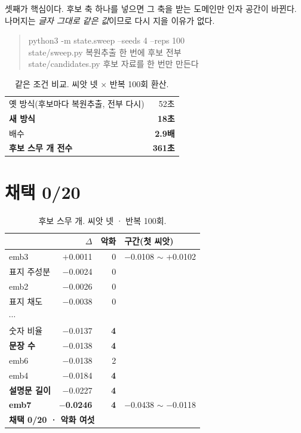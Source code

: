 \documentclass[10pt]{article}
\begin{document}
셋째가 핵심이다. 후보 축 하나를 넣으면 그 축을 받는 도메인만 인자 공간이
바뀐다. 나머지는 \emph{글자 그대로 같은 값}이므로 다시 지을 이유가 없다.

\begin{quote}\fontsize{9.0}{11}\selectfont\ttfamily
python3 -m state.sweep --seeds 4 --reps 100\\[.3em]
\rm state/sweep.py \quad 복원추출 한 번에 후보 전부\\
\rm state/candidates.py \quad 후보 자료를 한 번만 만든다
\end{quote}

\begin{table}[t]
\centering\tsize
\caption{같은 조건 비교. 씨앗 넷 $\times$ 반복 100회 환산.}
\begin{tabular}{lr}
\toprule
옛 방식(후보마다 복원추출, 전부 다시) & 52초 \\
\textbf{새 방식} & \textbf{18초} \\
\midrule
배수 & \textbf{2.9배} \\
\midrule
\textbf{후보 스무 개 전수} & \textbf{361초} \\
\bottomrule
\end{tabular}
\end{table}


\section{채택 0/20}

\begin{table}[t]
\centering\tsize
\caption{후보 스무 개. 씨앗 넷 · 반복 100회.}
\begin{tabular}{lrrl}
\toprule
& $\Delta$ & 악화 & 구간(첫 씨앗) \\
\midrule
emb3 & $+$0.0011 & 0 & $-$0.0108 $\sim$ $+$0.0102 \\
표지 주성분 & $-$0.0024 & 0 & \\
emb2 & $-$0.0026 & 0 & \\
표지 채도 & $-$0.0038 & 0 & \\
$\cdots$ & & & \\
숫자 비율 & $-$0.0137 & \textbf{4} & \\
\textbf{문장 수} & $-$0.0138 & \textbf{4} & \\
emb6 & $-$0.0138 & 2 & \\
emb4 & $-$0.0184 & \textbf{4} & \\
\textbf{설명문 길이} & $-$0.0227 & \textbf{4} & \\
\textbf{emb7} & \textbf{$-$0.0246} & \textbf{4} & $-$0.0438 $\sim$ $-$0.0118 \\
\midrule
\multicolumn{4}{l}{\textbf{채택 0/20 · 악화 여섯}} \\
\bottomrule
\end{tabular}
\end{table}
\end{document}
